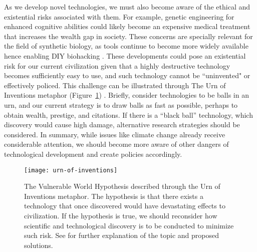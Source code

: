 As we develop novel technologies, we must also become aware of the ethical and existential risks associated with them.
For example, genetic engineering for enhanced cognitive abilities could likely become an expensive medical treatment that increases the wealth gap in society.
These concerns are specially relevant for the field of synthetic biology, as tools continue to become more widely available hence enabling DIY biohacking \citep{bennett2009}.
These developments could pose an existential risk for our current civilization given that a highly destructive technology becomes sufficiently easy to use,  and such technology cannot be ``uninvented" or effectively policed.
This challenge can be illustrated through The Urn of Inventions metaphor (Figure~\ref{fig8:vwh}) \citep{bostrom2019}. %
Briefly, consider technologies to be balls in an urn, and our current strategy is to draw balls as fast as possible, perhaps to obtain wealth, prestige, and citations.
If there is a ``black ball'' technology, which discovery would cause high damage, alternative research strategies should be considered.
In summary, while issues like climate change already receive considerable attention, we should become more aware of other dangers of technological development and create policies accordingly.

\begin{figure}[h]
  \centering
  \texttt{[image: urn-of-inventions]}
    \caption[The Vulnerable World Hypothesis]{The Vulnerable World Hypothesis described through the Urn of Inventions metaphor. The hypothesis is that there exists a technology that once discovered would have devastating effects to civilization. If the hypothesis is true, we should reconsider how scientific and technological discovery is to be conducted to minimize such risk. See \citep{bostrom2019} for further explanation of the topic and proposed solutions.}
    \label{fig8:vwh}
\end{figure}
